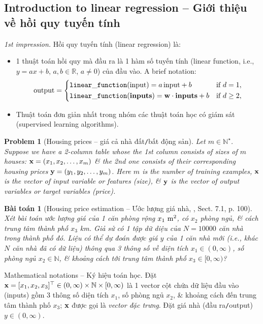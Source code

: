 \documentclass{article}
\newtheorem{baitoan}{Bài toán}
\newtheorem{problem}{Problem}
\begin{document}

\subsection{Introduction to linear regression -- Giới thiệu về hồi quy tuyến tính}
{\it1st impression.} Hồi quy tuyến tính (linear regression) là:
\begin{itemize}
	\item 1 thuật toán hồi quy mà đầu ra là 1 hàm số tuyến tính (linear function, i.e., $y = ax + b$, $a,b\in\mathbb{R}$, $a\ne0$) của đầu vào. A brief notation:
	\begin{equation*}
		{\rm output} = \left\{\begin{split}
			&{\tt linear\_function}({\rm input}) = a\,{\rm input} + b&&\mbox{if } d = 1,\\
			&{\tt linear\_function}({\bf inputs}) = {\bf w}\cdot{\bf inputs} + b&&\mbox{if } d\ge2,\\
		\end{split}\right.
	\end{equation*}
	\item Thuật toán đơn giản nhất trong nhóm các thuật toán học có giám sát (supervised learning algorithms).
\end{itemize}

\begin{problem}[Housing prices -- giá cả nhà đất{\tt/}bất động sản]
	Let $m\in\mathbb{N}^\star$. Suppose we have a 2-column table whose the 1st column consists of sizes of $m$ houses: ${\bf x} = (x_1,x_2,\ldots,x_m)$ \& the 2nd one consists of their corresponding housing prices ${\bf y} = (y_1,y_2,\ldots,y_m)$. Here $m$ is the number of training examples, ${\bf x}$ is the vector of input variable or features (size), \& ${\bf y}$ is the vector of output variables or target variables (price).
\end{problem}

\begin{baitoan}[Housing price estimation -- Ước lượng giá nhà, \cite{Tiep_ML_co_ban}, Sect. 7.1, p. 100]
	Xét bài toán ước lượng giá của 1 căn phòng rộng $x_1\ {\rm m}^2$, có $x_2$ phòng ngủ, \& cách trung tâm thành phố $x_3$ km. Giả sử có 1 tập dữ diệu của $N = 10000$ căn nhà trong thành phố đó. Liệu có thể dự đoán được giá $y$ của 1 căn nhà mới (i.e., khác $N$ căn nhà đã có dữ liệu) thông qua 3 thông số về diện tích $x_1\in(0,\infty)$, số phòng ngủ $x_2\in\mathbb{N}$, \& khoảng cách tới trung tâm thành phố $x_3\in[0,\infty)$?
\end{baitoan}
{\sf Mathematical notations -- Ký hiệu toán học.} Đặt ${\bf x} = [x_1,x_2,x_3]^\top\in(0,\infty)\times\mathbb{N}\times[0,\infty)$ là 1 vector cột chứa dữ liệu đầu vào (inputs) gồm 3 thông số diện tích $x_1$, số phòng ngủ $x_2$, \& khoảng cách đến trung tâm thành phố $x_3$; ${\bf x}$ được gọi là {\it vector đặc trưng}. Đặt giá nhà (đầu ra{\tt/}output) $y\in(0,\infty)$.
\end{document}
